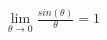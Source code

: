 \documentclass[preview]{standalone}
\begin{document}
\begin{align*}
\lim_{\theta\to0}\frac{sin(\theta)}{\theta}     =    1
\end{align*}
\end{document}
